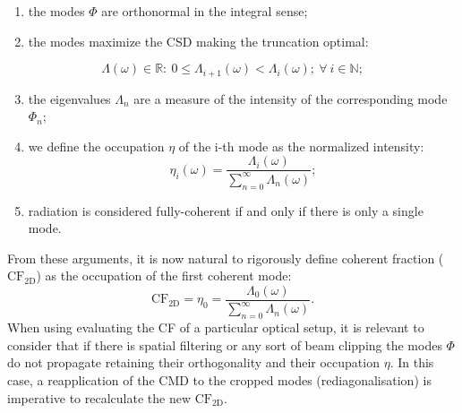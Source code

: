 \documentclass{iucr}              %
\begin{document}
\begin{enumerate}[label=(\roman*)]
\item the modes $\Phi$ are orthonormal in the integral sense;
\item the modes maximize the CSD making the truncation optimal:
\end{enumerate}
\begin{equation*}
\Lambda(\omega) \in \mathbb{R}
:~0\leq \Lambda_{i+1}(\omega)<\Lambda_i(\omega);~\forall~i \in \mathbb{N};
\end{equation*}
\begin{enumerate}[label=(\roman*)]
\setcounter{enumi}{2}
\item the eigenvalues $\Lambda_n$ are a measure of the intensity of the corresponding mode $\Phi_{n}$; 
\item we define the occupation $\eta$ of the i-th mode as the normalized intensity: 
\begin{equation}
\eta_i(\omega) =\frac{\Lambda_i(\omega)}{\sum\limits_{n=0}^\infty{\Lambda_n(\omega)}};
\end{equation}
\item radiation is considered fully-coherent if and only if there is only a single mode.
\end{enumerate}

From these arguments, it is now natural to rigorously define coherent fraction ($\text{CF}_\text{2D}$) as the occupation of the first coherent mode:
\begin{equation}
\text{CF}_\text{2D}=\eta_0=\frac{\Lambda_0(\omega)}{\sum\limits_{n=0}^\infty{\Lambda_n(\omega)}}. \label{eq:CF2D}
\end{equation}
When using evaluating the CF of a particular optical setup, it is relevant to consider that if there is spatial filtering or any sort of beam clipping the modes $\Phi$ do not propagate retaining their orthogonality and their occupation $\eta$. In this case, a reapplication of the CMD to the cropped modes (rediagonalisation) is imperative to recalculate the new $\text{CF}_\text{2D}$.
\end{document}
